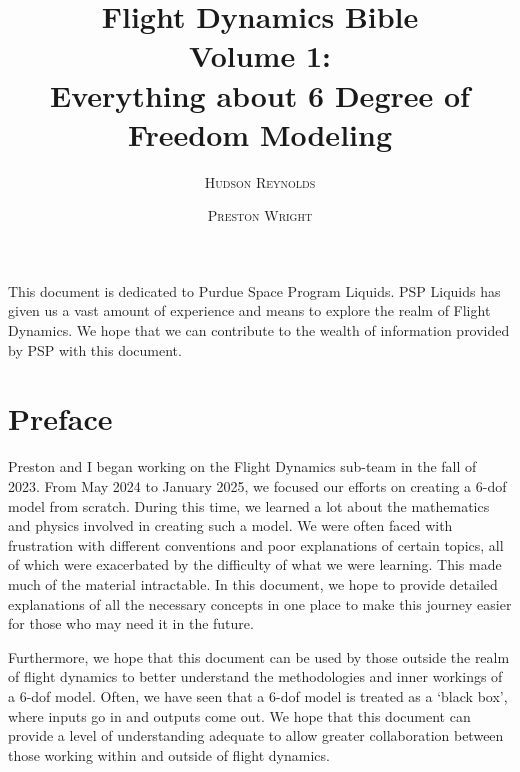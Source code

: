 \documentclass[12pt]{report}
\title{\Huge \textbf{Flight Dynamics Bible}  \\ \huge Volume 1: \\Everything about 6 Degree of Freedom Modeling}
\author{\textsc{Hudson Reynolds}
\and
\textsc{Preston Wright}
}
\newenvironment{dedication}
{
   \cleardoublepage
   \thispagestyle{empty}
   \vspace*{\stretch{1}}
   \hfill\begin{minipage}[t]{0.66\textwidth}
   \raggedright
}
{
   \end{minipage}
   \vspace*{\stretch{3}}
   \clearpage
}
\begin{document}
\pagestyle{fancy}
\renewcommand{\chaptermark}[1]{\markboth{#1}{#1}}
\fancyhead[R]{}
\fancyhead[L]{\thechapter\ --\ \leftmark}

\maketitle

%

\begin{dedication}
    This document is dedicated to Purdue Space Program Liquids. PSP Liquids has given us a vast amount of experience and means to explore the realm of Flight Dynamics. We hope that we can contribute to the wealth of information provided by PSP with this document.
\end{dedication}


\begin{spacing}{.5}
    \tableofcontents
    \listoffigures
    \lstlistoflistings
\end{spacing}


\chapter*{Preface}
Preston and I began working on the Flight Dynamics sub-team in the fall of 2023. From May 2024 to January 2025, we focused our efforts on creating a 6-\gls{dof} model from scratch. During this time, we learned a lot about the mathematics and physics involved in creating such a model. We were often faced with frustration with different conventions and poor explanations of certain topics, all of which were exacerbated by the difficulty of what we were learning. This made much of the material intractable. In this document, we hope to provide detailed explanations of all the necessary concepts in one place to make this journey easier for those who may need it in the future. 

Furthermore, we hope that this document can be used by those outside the realm of flight dynamics to better understand the methodologies and inner workings of a 6-\gls{dof} model. Often, we have seen that a 6-\gls{dof} model is treated as a ‘black box’, where inputs go in and outputs come out. We hope that this document can provide a level of understanding adequate to allow greater collaboration between those working within and outside of flight dynamics.
\end{document}
